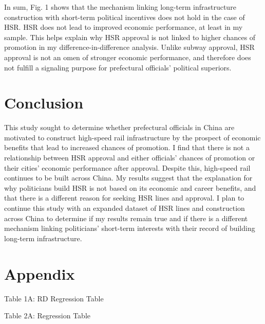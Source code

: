 \documentclass[12pt, ]{article}
\newenvironment{CSLReferences}[2]{

\clearpage
}{}
\begin{document}
In sum, Fig. 1 shows that the mechanism linking long-term infrastructure
construction with short-term political incentives does not hold in the
case of HSR. HSR does not lead to improved economic performance, at
least in my sample. This helps explain why HSR approval is not linked to
higher chances of promotion in my difference-in-difference analysis.
Unlike subway approval, HSR approval is not an omen of stronger economic
performance, and therefore does not fulfill a signaling purpose for
prefectural officials' political superiors.

\hypertarget{conclusion}{%
\section{Conclusion}\label{conclusion}}

This study sought to determine whether prefectural officials in China
are motivated to construct high-speed rail infrastructure by the
prospect of economic benefits that lead to increased chances of
promotion. I find that there is not a relationship between HSR approval
and either officials' chances of promotion or their cities' economic
performance after approval. Despite this, high-speed rail continues to
be built across China. My results suggest that the explanation for why
politicians build HSR is not based on its economic and career benefits,
and that there is a different reason for seeking HSR lines and approval.
I plan to continue this study with an expanded dataset of HSR lines and
construction across China to determine if my results remain true and if
there is a different mechanism linking politicians' short-term interests
with their record of building long-term infrastructure.

\newpage{}

\hypertarget{refs}{}

\begin{CSLReferences}{0}{0}\end{CSLReferences}

\appendix

\hypertarget{appendix}{%
\section{Appendix}\label{appendix}}

\newpage{}

\begin{table}
  \centering
  \caption*{Table 1A: RD Regression Table}
  \label{Table1A}
  
\end{table}

\begin{table}
  \centering
  \caption*{Table 2A: Regression Table}
  \label{Table2A}
  
\end{table}

\end{document}
